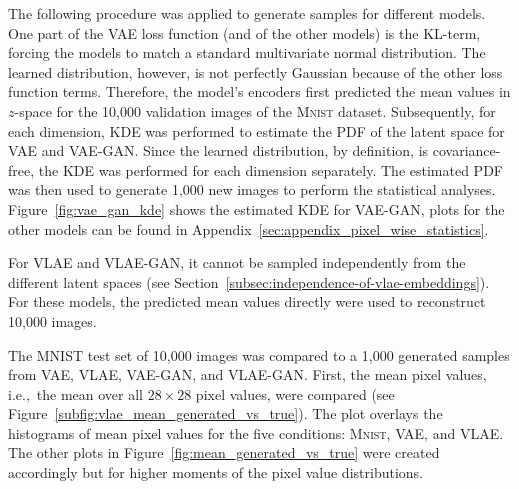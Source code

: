 The following procedure was applied to generate samples for different models.
One part of the \ac{VAE} loss function (and of the other models) is the \ac{KL}-term, forcing the models to match a standard multivariate normal distribution.
The learned distribution, however, is not perfectly Gaussian because of the other loss function terms.
Therefore, the model's encoders first predicted the mean values in $z$-space for the 10,000 validation images of the \textsc{Mnist} dataset.
Subsequently, for each dimension, \ac{KDE} was performed to estimate the \ac{PDF} of the latent space for \ac{VAE} and \ac{VAE}-\ac{GAN}.
Since the learned distribution, by definition, is covariance-free, the \ac{KDE} was performed for each dimension separately.
The estimated \ac{PDF} was then used to generate 1,000 new images to perform the statistical analyses.
Figure~\ref{fig:vae_gan_kde} shows the estimated \ac{KDE} for \ac{VAE}-\ac{GAN}, plots for the other models can be found in Appendix~\ref{sec:appendix_pixel_wise_statistics}.

For \ac{VLAE} and \ac{VLAE}-\ac{GAN}, it cannot be sampled independently from the different latent spaces (see Section~\ref{subsec:independence-of-vlae-embeddings}).
For these models, the predicted mean values directly were used to reconstruct 10,000 images.

The MNIST test set of 10,000 images was compared to a 1,000 generated samples from \ac{VAE}, \ac{VLAE}, \ac{VAE}-\ac{GAN}, and \ac{VLAE}-\ac{GAN}.
First, the mean pixel values, i.e.,~the mean over all $28\times 28$ pixel values, were compared (see Figure~\ref{subfig:vlae_mean_generated_vs_true}).
The plot overlays the histograms of mean pixel values for the five conditions: \textsc{Mnist}, \ac{VAE}, and \ac{VLAE}.
The other plots in Figure~\ref{fig:mean_generated_vs_true} were created accordingly but for higher moments of the pixel value distributions.

